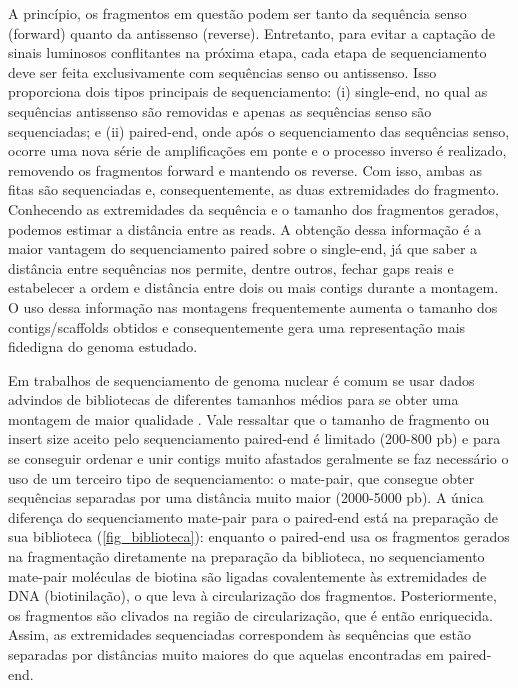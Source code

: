 \documentclass[../DISSERTACAO_MAIN.tex]{subfiles}
\begin{document}
A princípio, os fragmentos em questão podem ser tanto da sequência senso (forward) quanto da antissenso (reverse). Entretanto, para evitar a captação de sinais luminosos conflitantes na próxima etapa, cada etapa de sequenciamento deve ser feita exclusivamente com sequências senso ou antissenso. Isso proporciona dois tipos principais de sequenciamento: (i) single-end, no qual as sequências antissenso são removidas e apenas as sequências senso são sequenciadas; e (ii) paired-end, onde após o sequenciamento das sequências senso, ocorre uma nova série de amplificações em ponte e o processo inverso é realizado, removendo os fragmentos forward e mantendo os reverse. Com isso, ambas as fitas são sequenciadas e, consequentemente, as duas extremidades do fragmento. Conhecendo as extremidades da sequência e o tamanho dos fragmentos gerados, podemos estimar a distância entre as reads. A obtenção dessa informação é a maior vantagem do sequenciamento paired sobre o single-end, já que saber a distância entre sequências nos permite, dentre outros, fechar gaps reais e estabelecer a ordem e distância entre dois ou mais contigs durante a montagem. O uso dessa informação nas montagens frequentemente aumenta o tamanho dos contigs/scaffolds obtidos e consequentemente gera uma representação mais fidedigna do genoma estudado.

Em trabalhos de sequenciamento de genoma nuclear é comum se usar dados advindos de bibliotecas de diferentes tamanhos médios para se obter uma montagem de maior qualidade \cite{Rubin2016, Wirthlin2018}. Vale ressaltar que o tamanho de fragmento ou insert size aceito pelo sequenciamento paired-end é limitado (200-800 pb) e para se conseguir ordenar e unir contigs muito afastados geralmente se faz necessário o uso de um terceiro tipo de sequenciamento: o mate-pair, que consegue obter sequências separadas por uma distância muito maior (2000-5000 pb). A única diferença do sequenciamento mate-pair para o paired-end está na preparação de sua biblioteca (\autoref{fig_biblioteca}): enquanto o paired-end usa os fragmentos gerados na fragmentação diretamente na preparação da biblioteca, no sequenciamento mate-pair moléculas de biotina são ligadas covalentemente às extremidades de DNA (biotinilação), o que leva à circularização dos fragmentos. Posteriormente, os fragmentos são clivados na região de circularização, que é então enriquecida. Assim, as extremidades sequenciadas correspondem às sequências que estão separadas por distâncias muito maiores do que aquelas encontradas em paired-end.
\end{document}
